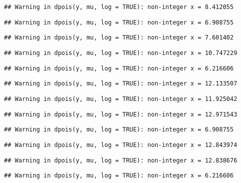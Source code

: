 \documentclass[
]{article}
\begin{document}
\begin{verbatim}
## Warning in dpois(y, mu, log = TRUE): non-integer x = 8.412055
\end{verbatim}

\begin{verbatim}
## Warning in dpois(y, mu, log = TRUE): non-integer x = 6.908755
\end{verbatim}

\begin{verbatim}
## Warning in dpois(y, mu, log = TRUE): non-integer x = 7.601402
\end{verbatim}

\begin{verbatim}
## Warning in dpois(y, mu, log = TRUE): non-integer x = 10.747229
\end{verbatim}

\begin{verbatim}
## Warning in dpois(y, mu, log = TRUE): non-integer x = 6.216606
\end{verbatim}

\begin{verbatim}
## Warning in dpois(y, mu, log = TRUE): non-integer x = 12.133507
\end{verbatim}

\begin{verbatim}
## Warning in dpois(y, mu, log = TRUE): non-integer x = 11.925042
\end{verbatim}

\begin{verbatim}
## Warning in dpois(y, mu, log = TRUE): non-integer x = 12.971543
\end{verbatim}

\begin{verbatim}
## Warning in dpois(y, mu, log = TRUE): non-integer x = 6.908755
\end{verbatim}

\begin{verbatim}
## Warning in dpois(y, mu, log = TRUE): non-integer x = 12.843974
\end{verbatim}

\begin{verbatim}
## Warning in dpois(y, mu, log = TRUE): non-integer x = 12.838676
\end{verbatim}

\begin{verbatim}
## Warning in dpois(y, mu, log = TRUE): non-integer x = 6.216606
\end{verbatim}
\end{document}
